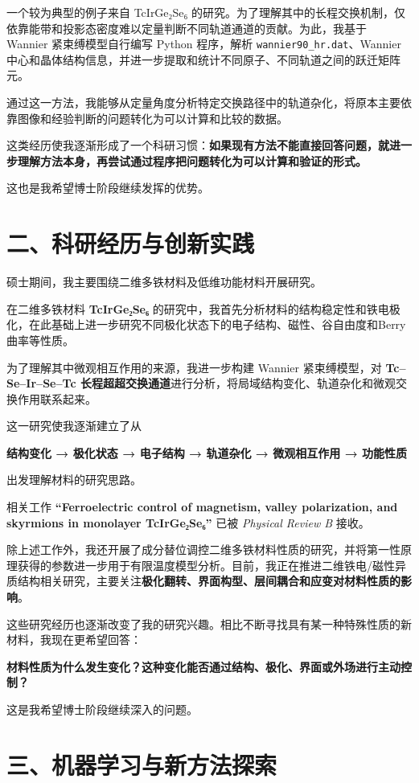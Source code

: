 一个较为典型的例子来自 TcIrGe₂Se₆ 的研究。为了理解其中的长程交换机制，仅依靠能带和投影态密度难以定量判断不同轨道通道的贡献。为此，我基于 Wannier 紧束缚模型自行编写 Python 程序，解析 \texttt{wannier90\_hr.dat}、Wannier中心和晶体结构信息，并进一步提取和统计不同原子、不同轨道之间的跃迁矩阵元。

通过这一方法，我能够从定量角度分析特定交换路径中的轨道杂化，将原本主要依靠图像和经验判断的问题转化为可以计算和比较的数据。

这类经历使我逐渐形成了一个科研习惯：\textbf{如果现有方法不能直接回答问题，就进一步理解方法本身，再尝试通过程序把问题转化为可以计算和验证的形式。}

这也是我希望博士阶段继续发挥的优势。

\section{二、科研经历与创新实践}

硕士期间，我主要围绕二维多铁材料及低维功能材料开展研究。

在二维多铁材料 \textbf{TcIrGe₂Se₆} 的研究中，我首先分析材料的结构稳定性和铁电极化，在此基础上进一步研究不同极化状态下的电子结构、磁性、谷自由度和Berry曲率等性质。

为了理解其中微观相互作用的来源，我进一步构建 Wannier 紧束缚模型，对 \textbf{Tc–Se–Ir–Se–Tc 长程超超交换通道}进行分析，将局域结构变化、轨道杂化和微观交换作用联系起来。

这一研究使我逐渐建立了从

\textbf{结构变化 → 极化状态 → 电子结构 → 轨道杂化 → 微观相互作用 → 功能性质}

出发理解材料的研究思路。

相关工作 \textbf{“Ferroelectric control of magnetism, valley polarization, and skyrmions in monolayer TcIrGe₂Se₆”} 已被 \textit{Physical Review B} 接收。

除上述工作外，我还开展了成分替位调控二维多铁材料性质的研究，并将第一性原理获得的参数进一步用于有限温度模型分析。目前，我正在推进二维铁电/磁性异质结构相关研究，主要关注\textbf{极化翻转、界面构型、层间耦合和应变对材料性质的影响}。

这些研究经历也逐渐改变了我的研究兴趣。相比不断寻找具有某一种特殊性质的新材料，我现在更希望回答：

\textbf{材料性质为什么发生变化？这种变化能否通过结构、极化、界面或外场进行主动控制？}

这是我希望博士阶段继续深入的问题。

\section{三、机器学习与新方法探索}


